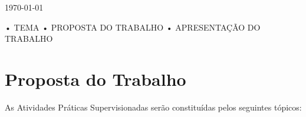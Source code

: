 \documentclass[12pt]{article}
\begin{document}
\begin{titlepage}
%



{\large \today}\\[2cm] %

\vfill %

\end{titlepage}




• TEMA
• PROPOSTA DO TRABALHO
• APRESENTAÇÃO DO TRABALHO

\tableofcontents


\section{Proposta do Trabalho}

As Atividades Práticas Supervisionadas serão constituídas pelos seguintes tópicos:

\renewcommand{\labelenumi}{\arabic{enumi})}
\renewcommand{\labelenumii}{\alph{enumii}.}
\end{document}
